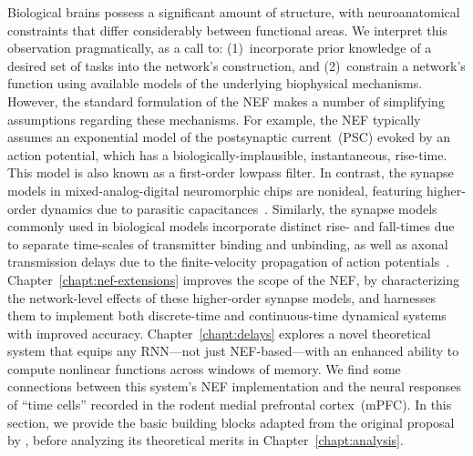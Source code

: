 Biological brains possess a significant amount of structure, with neuroanatomical constraints that differ considerably between functional areas. %
We interpret this observation pragmatically, as a call to: (1)~incorporate prior knowledge of a desired set of tasks into the network's construction, and (2)~constrain a network's function using available models of the underlying biophysical mechanisms.
However, the standard formulation of the NEF makes a number of simplifying assumptions regarding these mechanisms.
For example, the NEF typically assumes an exponential model of the postsynaptic current~(PSC) evoked by an action potential, which has a biologically-implausible, instantaneous, rise-time.
This model is also known as a first-order lowpass filter.
In contrast, the synapse models in mixed-analog-digital neuromorphic chips are nonideal, featuring higher-order dynamics due to parasitic capacitances~\citep{voelker2017iscas}.
Similarly, the synapse models commonly used in biological models incorporate distinct rise- and fall-times due to separate time-scales of transmitter binding and unbinding, as well as axonal transmission delays due to the finite-velocity propagation of action potentials~\citep{roth2009modeling}.
Chapter~\ref{chapt:nef-extensions} improves the scope of the NEF, by characterizing the network-level effects of these higher-order synapse models, and harnesses them to implement both discrete-time and continuous-time dynamical systems with improved accuracy.
Chapter~\ref{chapt:delays} explores a novel theoretical system that equips any RNN---not just NEF-based---with an enhanced ability to compute nonlinear functions across windows of memory.
We find some connections between this system's NEF implementation and the neural responses of ``time cells'' recorded in the rodent medial prefrontal cortex~(mPFC).
In this section, we provide the basic building blocks adapted from the original proposal by \citet{eliasmith2003a}, before analyzing its theoretical merits in Chapter~\ref{chapt:analysis}.

